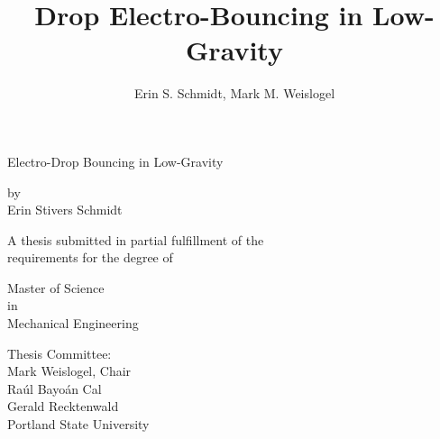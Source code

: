 \documentclass[12pt,a4paper,oneside]{book}
\title{Drop Electro-Bouncing in Low-Gravity}
\author{Erin S. Schmidt, Mark M. Weislogel}
\date{}
\newcommand\blankpage{%
    \null
    \thispagestyle{empty}%
    \addtocounter{page}{-1}%
    \newpage}
\begin{document}
\newcommand{\redline}{\raisebox{2pt}{\tikz{\draw[-,red,solid,line width = 1.5pt](0,0) -- (5mm,0);}}}
\begin{titlepage}
\doublespacing

\centering %
{\textsf{{Electro-Drop Bouncing in Low-Gravity}}}

\vspace{15ex}
by\\
Erin Stivers Schmidt

\vspace{15ex}
\singlespacing
A thesis submitted in partial fulfillment of the\\
requirements for the degree of

\vspace{11ex}
Master of Science\\
in\\
Mechanical Engineering

\vspace{12ex}
Thesis Committee:\\
Mark Weislogel, Chair\\
Ra\'ul Bayo\'an Cal\\
Gerald Recktenwald\\


\vfill
\vspace{2ex}
Portland State University\\%
{\number\year}
\end{titlepage}


\clearpage

\frontmatter
\end{document}
